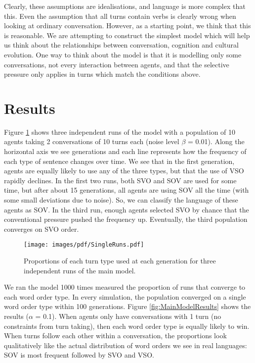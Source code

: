 \documentclass[12pt]{article}
\begin{document}
Clearly, these assumptions are idealisations, and language is more complex that this.  Even the assumption that all turns contain verbs is clearly wrong when looking at ordinary conversation.  However, as a starting point, we think that this is reasonable.  We are attempting to construct the simplest model which will help us think about the relationships between conversation, cognition and cultural evolution.  One way to think about the model is that it is modelling only some conversations, not every interaction between agents, and that the selective pressure only applies in turns which match the conditions above.

\section{Results}

Figure \ref{fig:SingleRuns} shows three independent runs of the model with a population of 10 agents taking 2 conversations of 10 turns each (noise level $\beta$ = 0.01).  Along the horizontal axis we see generations and each line represents how the frequency of each type of sentence changes over time.  We see that in the first generation, agents are equally likely to use any of the three types, but that the use of VSO rapidly declines.  In the first two runs, both SVO and SOV are used for some time, but after about 15 generations, all agents are using SOV all the time (with some small deviations due to noise).  So, we can classify the language of these agents as SOV.  In the third run, enough agents selected SVO by chance that the conventional pressure pushed the frequency up.  Eventually, the third population converges on SVO order.  

\begin{figure}[htbp]
\begin{center}
\texttt{[image: images/pdf/SingleRuns.pdf]}
\caption{Proportions of each turn type used at each generation for three independent runs of the main model.}
\label{fig:SingleRuns}
\end{center}
\end{figure}

We ran the model 1000 times measured the proportion of runs that converge to each word order type.  In every simulation, the population converged on a single word order type within 100 generations.   Figure \ref{fig:MainModelResults} shows the results ($\alpha$ = 0.1).  When agents only have conversations with 1 turn (no constraints from turn taking), then each word order type is equally likely to win.  When turns follow each other within a conversation, the proportions look qualitatively like the actual distribution of word orders we see in real languages:  SOV is most frequent followed by SVO and VSO.
\end{document}
